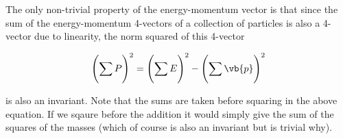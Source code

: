 \documentclass[english,a4paper,12pt]{report}
\begin{document}
The only non-trivial property of the energy-momentum vector is that since the sum of the energy-momentum 4-vectors of a collection of particles is also a 4-vector due to linearity, the norm squared of this 4-vector

\begin{equation}
    \left( \sum_{}^{} P \right)^2 = \left( \sum_{}^{} E \right) ^2 - \left( \sum_{}^{} \vb{p}   \right) ^2 
\end{equation}

is also an invariant. Note that the sums are taken before squaring in the above equation. If we sqaure before the addition it would simply give the sum of the squares of the masses (which of course is also an invariant but is trivial why).

\end{document}
